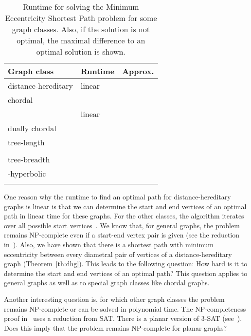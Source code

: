 \documentclass[10pt]{llncs}
\begin{document}
\begin{table}
    [htb]
    \caption
    {Runtime for solving the Minimum Eccentricity Shortest Path problem for some graph classes. Also, if the solution is not optimal, the maximal difference to an optimal solution is shown.
    }
    \label{tbl:Results}
    \centering
    \begin{tabular}{@{\quad}l@{\quad}||@{\quad}l@{\quad}@{\quad}||@{\quad}l@{\quad}}
        Graph class & Runtime & Approx. \\
        \hline
        \hline
        distance-hereditary & linear \\
        \hline
        chordal &  \\
                & linear &  \\
        \hline
        dually chordal &  \\
        \hline
        tree-length~ &  \\
                              &   &  \\
        \hline
        tree-breadth~ &  \\
        \hline
        -hyperbolic &  \\
                            &  & \\
    \end{tabular}

\end{table}

One reason why the runtime to find an optimal path for distance-hereditary graphs is linear is that we can determine the start and end vertices of an optimal path in linear time for these graphs.
For the other classes, the algorithm iterates over all possible start vertices~.
We know that, for general graphs, the problem remains NP-complete even if a start-end vertex pair is given (see the reduction in~\cite{DrLei2015}).
Also, we have shown that there is a shortest path with minimum eccentricity between every diametral pair of vertices of a distance-hereditary graph (Theorem~\ref{th:dhg}).
This leads to the following question:
How hard is it to determine the start and end vertices of an optimal path?
This question applies to general graphs as well as to special graph classes like chordal graphs.

Another interesting question is, for which other graph classes the problem remains NP-complete or can be solved in polynomial time.
The NP-completeness proof in~\cite{DrLei2015} uses a reduction from SAT.
There is a planar version of 3-SAT (see~\cite{Lichtenstein1982}).
Does this imply that the problem remains NP-complete for planar graphs?
\end{document}
